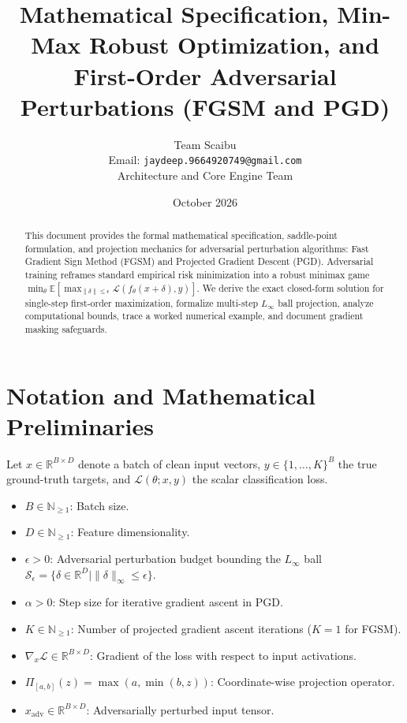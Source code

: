 \documentclass[11pt,a4paper]{article}
\title{\textbf{Mathematical Specification, Min-Max Robust Optimization, and First-Order Adversarial Perturbations (FGSM and PGD)}}
\author{Team Scaibu \\ \small Email: \texttt{jaydeep.9664920749@gmail.com} \\ \small Architecture and Core Engine Team}
\date{October 2026}
\theoremstyle{definition}
\begin{document}
\maketitle

\begin{abstract}
This document provides the formal mathematical specification, saddle-point formulation, and projection mechanics for adversarial perturbation algorithms: Fast Gradient Sign Method (FGSM) and Projected Gradient Descent (PGD). Adversarial training reframes standard empirical risk minimization into a robust minimax game $\min_\theta \mathbb{E} [\max_{\|\delta\| \le \epsilon} \mathcal{L}(f_\theta(x + \delta), y)]$. We derive the exact closed-form solution for single-step first-order maximization, formalize multi-step $L_\infty$ ball projection, analyze computational bounds, trace a worked numerical example, and document gradient masking safeguards.
\end{abstract}

\section{Notation and Mathematical Preliminaries}

Let $x \in \mathbb{R}^{B \times D}$ denote a batch of clean input vectors, $y \in \{1, \dots, K\}^B$ the true ground-truth targets, and $\mathcal{L}(\theta; x, y)$ the scalar classification loss.

\begin{itemize}
    \item $B \in \mathbb{N}_{\ge 1}$: Batch size.
    \item $D \in \mathbb{N}_{\ge 1}$: Feature dimensionality.
    \item $\epsilon > 0$: Adversarial perturbation budget bounding the $L_\infty$ ball $\mathcal{S}_\epsilon = \{\delta \in \mathbb{R}^D \mid \|\delta\|_\infty \le \epsilon\}$.
    \item $\alpha > 0$: Step size for iterative gradient ascent in PGD.
    \item $K \in \mathbb{N}_{\ge 1}$: Number of projected gradient ascent iterations ($K = 1$ for FGSM).
    \item $\nabla_x \mathcal{L} \in \mathbb{R}^{B \times D}$: Gradient of the loss with respect to input activations.
    \item $\Pi_{[a, b]}(z) = \max(a, \min(b, z))$: Coordinate-wise projection operator.
    \item $x_{\text{adv}} \in \mathbb{R}^{B \times D}$: Adversarially perturbed input tensor.
\end{itemize}
\end{document}
